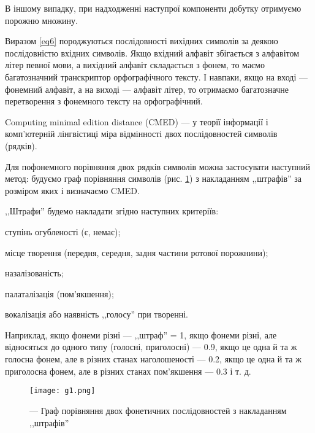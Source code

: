\documentclass{diploma}
\begin{document}
В іншому випадку, при надходженні наступрої компоненти добутку отримуємо порожню множину.

Виразом \eqref{eq6} породжуються послідовності вихідних символів за деякою послідовністю вхідних символів. Якщо вхідний алфавіт збігається з алфавітом літер певної мови, а вихідний алфавіт складається з фонем, то маємо багатозначний транскриптор орфографічного тексту. І навпаки, якщо на вході --- фонемний алфавіт, а на виході --- алфавіт літер, то отримаємо багатозначне перетворення з фонемного тексту на орфографічний.~\cite{l4}




Computing minimal edition distance (CMED) --- у теорії інформації і комп'ютерній лінгвістиці міра відмінності двох послідовностей символів (рядків).~\cite{u1}

Для пофонемного порівняння двох рядків символів можна застосувати наступний метод: будуємо граф порівняння символів (рис. \ref{p1}) з накладанням ,,штрафів'' за розміром яких і визначаємо CMED.

,,Штрафи'' будемо накладати згідно наступних критеріїв: 

\begin{itemizer}
\item ступінь огубленості (є, немає);
\item місце творення (передня, середня, задня частини ротової порожнини);
\item назалізованість;
\item палаталізація (пом'якшення);
\item вокалізація або наявність ,,голосу'' при творенні.
\end{itemizer}

Наприклад, якщо фонеми різні --- ,,штраф'' = 1, якщо фонеми різні, але відносяться до одного типу (голосні, приголосні) --- 0.9, якщо це одна й та ж голосна фонем, але в різних станах наголошеності --- 0.2, якщо це одна й та ж приголосна фонем, але в різних станах пом'якшення --- 0.3 і т. д.

\begin{figure}[hb] 
 	\centering 
 	\texttt{[image: g1.png]} 
 	\caption{--- Граф порівняння двох фонетичних послідовностей з накладанням ,,штрафів''}\label{p1}
\end{figure}



\end{document}
